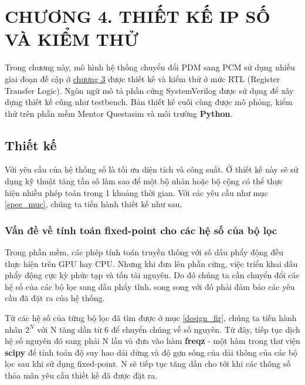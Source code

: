 \section*{CHƯƠNG 4. THIẾT KẾ IP SỐ VÀ KIỂM THỬ} \label{chuong4}
\setcounter{section}{4}
\setcounter{subsection}{0}
\setcounter{figure}{0}
\setcounter{table}{0}
Trong chương này, mô hình hệ thống chuyển đổi PDM sang PCM sử dụng nhiều giai đoạn đề cập ở \hyperref[chuong3]{chương 3} được thiết kế và kiểm thử ở mức RTL (Register Transfer Logic). Ngôn ngữ mô tả phần cứng SystemVerilog được sử dụng để xây dựng thiết kế cũng như testbench. Bản thiết kế cuối cùng được mô phỏng, kiểm thử trên phần mềm Mentor Questasim và môi trường \textbf{Python}.
\subsection{Thiết kế}
Với yêu cầu của hệ thống số là tối ưu diện tích và công suất. Ở thiết kế này sẽ sử dụng kỹ thuật tăng tần số làm sao để một bộ nhân hoặc bộ cộng có thể thực hiện nhiều phép toán trong 1 khoảng thời gian. Với các yêu cầu như mục \ref{spec_muc}, chúng ta tiến hành thiết kế như sau.
\subsubsection{Vấn đề về tính toán fixed-point cho các hệ số của bộ lọc} \label{fix-fil}
Trong phần mềm, các phép tính toán truyền thống với số dấu phẩy động đều thực hiện
trên GPU hay CPU. Nhưng khi đưa lên phần cứng, việc triển khai dấu phẩy động cực kỳ phức tạp và tốn tài nguyên. Do đó chúng ta cần chuyển đổi các hệ số của các bộ lọc sang dấu phẩy tĩnh, song song với đó phải đảm bảo các yêu cầu đã đặt ra của hệ thống.

Từ các hệ số của từng bộ lọc đã tìm được ở mục \ref{design_fir}, chúng ta tiến hành nhân $2^N$ với N tăng dần từ 6 để chuyển chúng về số nguyên. Từ đây, tiếp tục dịch hệ số nguyên đó sang phải N lần và đưa vào hàm \textbf{freqz} - một hàm trong thư viện \textbf{scipy} để tính toán độ suy hao dải dừng và độ gợn sóng của dải thông của các bộ lọc sau khi sử dụng fixed-point. N sẽ tiếp tục tăng dần cho tới khi các thông số thỏa mãn yêu cầu thiết kế đã được đặt ra. 


